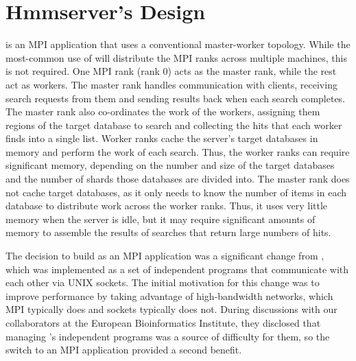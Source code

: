 \documentclass[notoc,justified,openany]{tufte-book}    %
\newcommand{\hmmserver}{\mono{hmmserver}\xspace}
\newcommand{\Hmmserver}{\mono{Hmmserver}\xspace}
\newcommand{\hmmpgmd}{\mono{hmmpgmd}\xspace}
\begin{document}
\chapter{Hmmserver's Design}
\Hmmserver is an MPI application that uses a conventional master-worker topology.  While the most-common use of \hmmserver will distribute the MPI ranks across multiple machines, this is not required.  One MPI rank (rank 0) acts as the master rank, while the rest act as workers.  The master rank handles communication with clients, receiving search requests from them and sending results back when each search completes.  The master rank also co-ordinates the work of the workers, assigning them regions of the target database to search and collecting the hits that each worker finds into a single list.  Worker ranks cache the server's target databases in memory and perform the work of each search.  Thus, the worker ranks can require significant memory, depending on the number and size of the target databases and the number of shards those databases are divided into.  The master rank does not cache target databases, as it only needs to know the number of items in each database to distribute work across the worker ranks.  Thus, it uses very little memory when the server is idle, but it may require significant amounts of memory to assemble the results of searches that return large numbers of hits.

The decision to build \hmmserver as an MPI application was a significant change from \hmmpgmd, which was implemented as a set of independent programs that communicate with each other via UNIX sockets.  The initial motivation for this change was to improve performance by taking advantage of high-bandwidth networks, which MPI typically does and sockets typically does not.  During discussions with our collaborators at the European Bioinformatics Institute, they disclosed that managing \hmmpgmd's independent programs was a source of difficulty for them, so the switch to an MPI application provided a second benefit.
\end{document}
